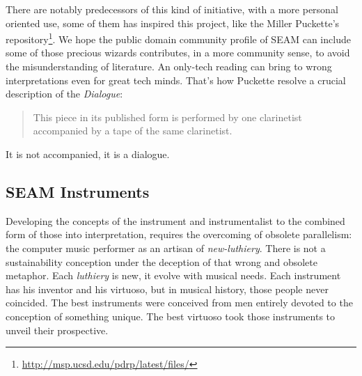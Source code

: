 \documentclass[twoside,a4paper]{article}
\begin{document}
There are notably predecessors of this kind of initiative, with a more personal oriented use, some of them has inspired this project, like the Miller Puckette's repository\footnote{\url{http://msp.ucsd.edu/pdrp/latest/files/}}. We hope the public domain community profile of SEAM can include some of those precious wizards contributes, in a more community sense, to avoid the misunderstanding of literature. An only-tech reading can bring to wrong interpretations even for great tech minds. That's how Puckette \cite{mp01} resolve a crucial description of the \emph{Dialogue}:

\begin{quote}
This piece in its published form is performed by one clarinetist accompanied by a tape of the same clarinetist.
\end{quote}

It is not accompanied, it is a dialogue. 


\subsection{SEAM Instruments}

Developing the concepts of the instrument and instrumentalist to the combined form of those into interpretation, \cite{lem16,mp01,savi85} requires the overcoming of obsolete parallelism: the computer music performer as an artisan of \emph{new-luthiery}. There is not a sustainability conception under the deception of that wrong and obsolete metaphor. Each \emph{luthiery} is new, it evolve with musical needs. Each instrument has his inventor and his virtuoso, but in musical history, those people never coincided. The best instruments were conceived from men entirely devoted to the conception of something unique. The best virtuoso took those instruments to unveil their prospective.

\end{document}
